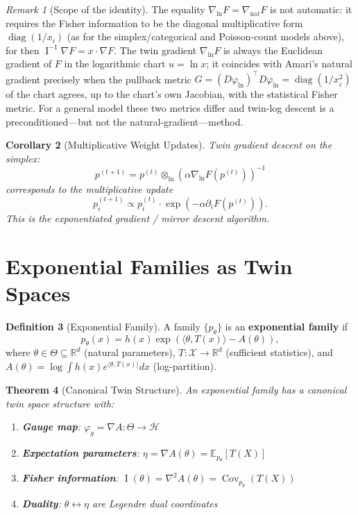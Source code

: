 \documentclass[11pt,twoside]{book}
\theoremstyle{plain}
\newtheorem{theorem}{Theorem}[chapter]
\newtheorem{corollary}[theorem]{Corollary}
\theoremstyle{definition}
\newtheorem{definition}[theorem]{Definition}
\theoremstyle{remark}
\newtheorem{remark}[theorem]{Remark}
\newcommand{\R}{\mathbb{R}}
\newcommand{\E}{\mathbb{E}}
\DeclareMathOperator{\Cov}{Cov}
\DeclareMathOperator{\diag}{diag}
\DeclareMathOperator{\Fisher}{I}
\newcommand{\nabnat}{\nabla_{\mathrm{nat}}}
\begin{document}
\begin{remark}[Scope of the identity]
    The equality $\nabla_{\ln} F = \nabnat F$ is not automatic: it requires the
    Fisher information to be the diagonal multiplicative form $\diag(1/x_i)$
    (as for the simplex/categorical and Poisson-count models above), for then
    $\Fisher^{-1}\nabla F = x \cdot \nabla F$. The twin gradient $\nabla_{\ln} F$
    is always the Euclidean gradient of $F$ in the logarithmic chart
    $u = \ln x$; it coincides with Amari's natural gradient precisely when the
    pullback metric $G = (D\varphi_{\ln})^\top D\varphi_{\ln} = \diag(1/x_i^2)$
    of the chart agrees, up to the chart's own Jacobian, with the statistical
    Fisher metric. For a general model these two metrics differ and twin-log
    descent is a preconditioned---but not the natural-gradient---method.
\end{remark}

\begin{corollary}[Multiplicative Weight Updates]
    Twin gradient descent on the simplex:
    \[
    p^{(t+1)} = p^{(t)} \otimes_{\ln} (\alpha \nabla_{\ln} F(p^{(t)}))^{-1}
    \]
    corresponds to the multiplicative update
    \[
    p_i^{(t+1)} \propto p_i^{(t)} \cdot \exp(-\alpha \partial_i F(p^{(t)})).
    \]
    This is the exponentiated gradient / mirror descent algorithm.
\end{corollary}

\section{Exponential Families as Twin Spaces}
\label{sec:exp_families_twin}

\begin{definition}[Exponential Family]
    A family $\{p_\theta\}$ is an \textbf{exponential family} if
    \[
    p_\theta(x) = h(x) \exp(\langle \theta, T(x) \rangle - A(\theta)),
    \]
    where $\theta \in \Theta \subseteq \R^d$ (natural parameters), $T : \mathcal{X} \to \R^d$ (sufficient statistics), and $A(\theta) = \log \int h(x) e^{\langle \theta, T(x) \rangle} dx$ (log-partition).
\end{definition}

\begin{theorem}[Canonical Twin Structure]
    \label{thm:exp_family_twin}
    An exponential family has a canonical twin space structure with:
    \begin{enumerate}
        \item \textbf{Gauge map}: $\varphi_g = \nabla A : \Theta \to \mathcal{H}$
        \item \textbf{Expectation parameters}: $\eta = \nabla A(\theta) = \E_{p_\theta}[T(X)]$
        \item \textbf{Fisher information}: $\Fisher(\theta) = \nabla^2 A(\theta) = \Cov_{p_\theta}(T(X))$
        \item \textbf{Duality}: $\theta \leftrightarrow \eta$ are Legendre dual coordinates
    \end{enumerate}
\end{theorem}
\end{document}
